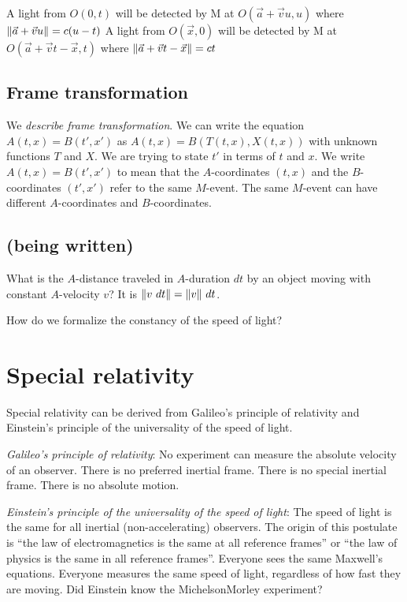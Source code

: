 A light from $O(0,t)$ will be detected by M at $O(\vec{a}+\vec{v}u,u)$ where $\norm{\vec{a}+\vec{v}u} = c(u-t)$
A light from $O(\vec{x},0)$ will be detected by M at $O(\vec{a}+\vec{v}t-\vec{x},t)$ where $\norm{\vec{a}+\vec{v}t-\vec{x}} = ct$

\subsection{Frame transformation}

We \emph{describe frame transformation}.
We can write the equation \(A(t,x) = B(t',x')\) as \(A(t,x) = B(T(t,x), X(t,x))\)
with unknown functions \(T\) and \(X\).
We are trying to state \(t'\) in terms of \(t\) and \(x\).
We write \(A(t,x) = B(t',x')\) to mean that the \(A\)-coordinates \((t,x)\)
and the \(B\)-coordinates \((t',x')\) refer to the same \(M\)-event.
The same \(M\)-event can have different \(A\)-coordinates and \(B\)-coordinates.

\subsection{(being written)}

What is the \(A\)-distance traveled in \(A\)-duration \(dt\) by an object moving with constant \(A\)-velocity \(v\)?
It is \(\norm{v ~ dt} = \norm{v} ~ dt\).

How do we formalize the constancy of the speed of light?

\section{Special relativity}

Special relativity can be derived from Galileo's principle of relativity
and Einstein's principle of the universality of the speed of light.
\cite[p.~1]{schutz2009first}

%
%
\emph{Galileo's principle of relativity}: No experiment can measure the absolute velocity of an observer.
There is no preferred inertial frame.
There is no special inertial frame.
There is no absolute motion.

%
%
\emph{Einstein's principle of the universality of the speed of light}:
The speed of light is the same for all inertial (non-accelerating) observers.
The origin of this postulate is \enquote{the law of electromagnetics is the same at all reference frames}
or \enquote{the law of physics is the same in all reference frames}.
Everyone sees the same Maxwell's equations.
Everyone measures the same speed of light,
regardless of how fast they are moving.
Did Einstein know the Michelson\textendash{}Morley experiment?

